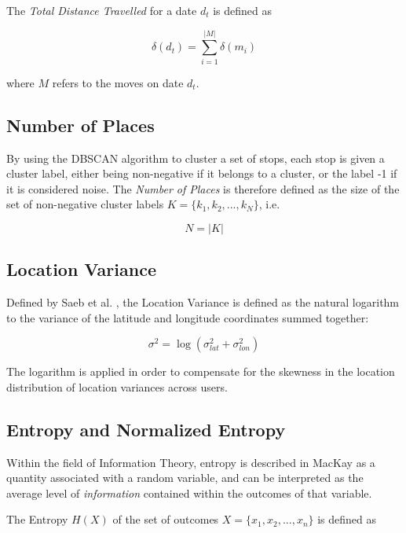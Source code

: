 The \textit{Total Distance Travelled} for a date $d_t$ is defined as 

\begin{equation}
\label{eq:feature-total-distance}
\delta (d_t) = \sum_{i=1}^{|M|} \delta (m_i)
\end{equation}

where $M$ refers to the moves on date $d_t$.

\subsection{Number of Places}
By using the DBSCAN algorithm to cluster a set of stops, each stop is given a cluster label, either being non-negative if it belongs to a cluster, or the label -1 if it is considered noise. The \textit{Number of Places} is therefore defined as the size of the set of non-negative cluster labels $K = \{k_1, k_2, ..., k_N\}$, i.e.

\begin{equation}
\label{eq:feature-num-places}
N = |K|
\end{equation}

\subsection{Location Variance}
Defined by Saeb et al. \cite{Saeb2015}, the Location Variance is defined as the natural logarithm to the variance of the latitude and longitude coordinates summed together: 

\begin{equation}
\label{eq:feature-log-var}
\sigma^2 = \log (\sigma_{lat}^2 + \sigma_{lon}^2)
\end{equation}

The logarithm is applied in order to compensate for the skewness in the location distribution of location variances across users.

\subsection{Entropy and Normalized Entropy}
Within the field of Information Theory, entropy is described in MacKay \cite{information-theory} as a quantity associated with a random variable, and can be interpreted as the average level of \textit{information} contained within the outcomes of that variable. 

The Entropy $H(X)$ of the set of outcomes $X = \{x_1, x_2, ..., x_n\}$ is defined as

